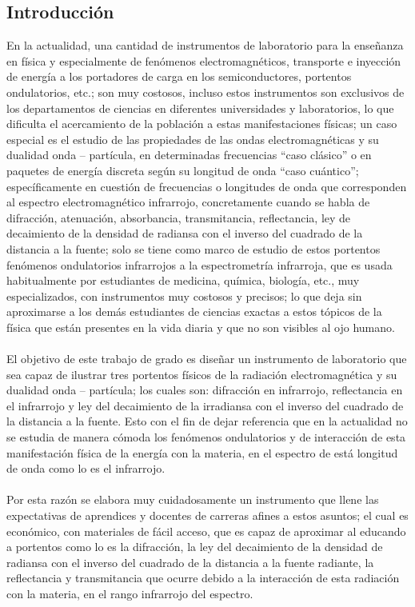 \documentclass[12]{article}
\begin{document}
\begin{multicols}{2}
\section{Introducción}
En la actualidad, una cantidad de instrumentos de laboratorio para la enseñanza en física y especialmente de  fenómenos electromagnéticos,  transporte e inyección de energía a los portadores de carga en los semiconductores, portentos ondulatorios, etc.; son  muy costosos, incluso estos instrumentos son exclusivos de los departamentos de ciencias en diferentes  universidades y laboratorios, lo que dificulta el acercamiento de la población a estas manifestaciones físicas; un caso especial es el estudio de las propiedades de las ondas electromagnéticas y su dualidad onda – partícula, en determinadas frecuencias “caso clásico” o en paquetes de energía discreta según su longitud de onda “caso cuántico”; específicamente en cuestión de frecuencias o longitudes de onda que corresponden al espectro electromagnético infrarrojo, concretamente cuando se habla de difracción, atenuación, absorbancia, transmitancia, reflectancia,   ley de decaimiento de la densidad de radiansa con el inverso del cuadrado de la distancia a la fuente; solo se tiene como marco de estudio de estos portentos fenómenos ondulatorios infrarrojos a la espectrometría  infrarroja, que es usada habitualmente por estudiantes de medicina, química, biología, etc., muy especializados, con instrumentos muy costosos y precisos;  lo que deja sin aproximarse a los demás estudiantes de ciencias exactas a estos tópicos de la física que están presentes en la vida diaria y que no son visibles al ojo humano.\\\\
El objetivo de este trabajo de grado es diseñar un instrumento de laboratorio que sea capaz de ilustrar tres  portentos físicos  de la radiación electromagnética y su dualidad onda – partícula; los cuales son: difracción en infrarrojo, reflectancia en el infrarrojo y ley del decaimiento de la irradiansa con el inverso del cuadrado de la distancia a la fuente. Esto con el fin de dejar  referencia que en la actualidad no se estudia de manera cómoda los fenómenos ondulatorios y de interacción de esta manifestación física de la energía con la materia, en el espectro de está longitud de onda como lo es el infrarrojo. \\\\
Por esta razón se elabora muy cuidadosamente un instrumento que llene las expectativas de aprendices y docentes de carreras afines a  estos asuntos;  el cual es económico, con materiales de fácil acceso, que es capaz de aproximar al educando a portentos como lo es la difracción, la ley del decaimiento de  la densidad de radiansa con el inverso del cuadrado de la distancia a la fuente radiante,  la reflectancia y  transmitancia que ocurre debido a la interacción de esta radiación con la materia, en el rango infrarrojo del espectro.  \\\\

\end{multicols}
\end{document}
